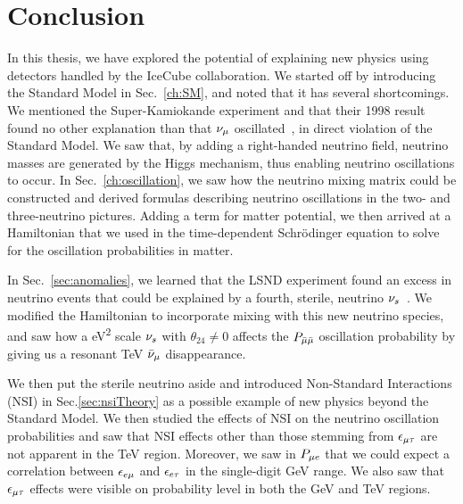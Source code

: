 \chapter{Conclusion}\label{ch:conc}
In this thesis, we have explored the potential of explaining new physics using detectors handled by the IceCube collaboration.
We started off by introducing the Standard Model in Sec.~\ref{ch:SM}, and noted that it has several shortcomings. 
We mentioned the Super-Kamiokande experiment and that their 1998 result found no other explanation than that $\nu_\mu$ oscillated~\cite{sk1998}, in direct violation of the Standard Model. 
We saw that, by adding a right-handed neutrino field, neutrino masses are generated by the Higgs mechanism, thus enabling neutrino oscillations to occur. 
In Sec.~\ref{ch:oscillation}, we saw how the neutrino mixing matrix could be constructed and derived formulas describing neutrino oscillations in the two- and three-neutrino pictures. Adding a term for matter potential,
we then arrived at a Hamiltonian that we used in the time-dependent Schrödinger equation to solve for the oscillation probabilities in matter.

In Sec.~\ref{sec:anomalies}, we learned that the LSND experiment found an excess in neutrino events that could be explained by a fourth, sterile, neutrino $\nu_s$~\cite{lsnd}.
We modified the Hamiltonian to incorporate mixing with this new neutrino species, and saw how a \si{\eV^2} scale  $\nu_s$ with $\theta_{24}\neq 0$ affects the $P_{\bar{\mu} \bar{\mu}}$ oscillation probability 
by giving us a resonant \si{\TeV} $\bar{\nu}_\mu$ disappearance.

We then put the sterile neutrino aside and introduced Non-Standard Interactions (NSI) in Sec.\ref{sec:nsiTheory} as a possible example of new physics beyond the Standard Model.
We then studied the effects of NSI on the neutrino oscillation probabilities and saw that NSI effects other than those stemming from $\epsilon_{\mu\tau}$ are not apparent in the \si{\TeV} region.
Moreover, we saw in $P_{\mu e}$ that we could expect a correlation between $\epsilon_{e\mu}$ and $\epsilon_{e\tau}$ in the single-digit \si{\GeV} range.
We also saw that $\epsilon_{\mu\tau}$ effects were visible on probability level in both the \si{\GeV} and \si{\TeV} regions.


